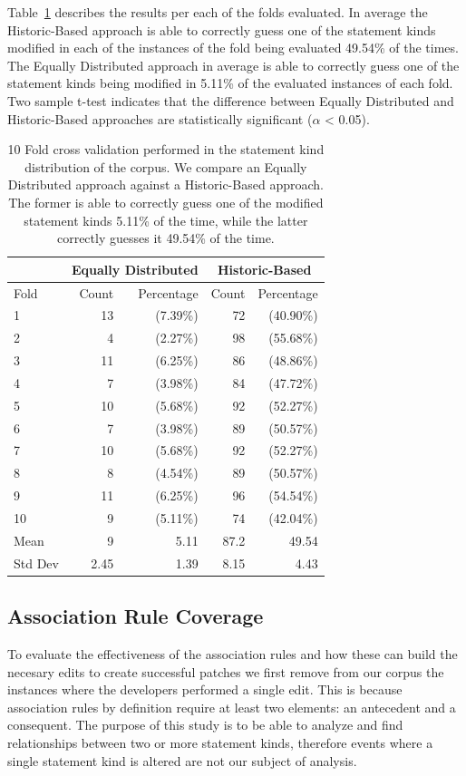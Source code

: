 \documentclass[sigconf]{acmart}
\begin{document}
Table~\ref{10FoldEDvsHB} describes the results per each of the folds evaluated.
In average 
the Historic-Based approach is able to correctly guess one of  the statement kinds modified
in each of the instances of the fold being evaluated 49.54\% of the times. The Equally Distributed approach
in average is able to correctly guess one of the statement kinds being modified in 5.11\% 
of the evaluated instances of each fold.
Two sample t-test indicates that the difference between Equally Distributed and Historic-Based approaches are statistically significant ($\alpha$ < 0.05).


\begin{table}[]
\centering
\caption{10 Fold cross validation performed in the statement kind distribution of the corpus. 
We compare an Equally Distributed approach against a Historic-Based approach. The former is 
able to correctly guess one of the modified statement kinds 5.11\% of the time, while the 
latter correctly guesses it 49.54\% of the time.}
\label{10FoldEDvsHB}
\begin{tabular}{l|rr|rr|}
\toprule
   &   \multicolumn{2}{c|}{ Equally Distributed}   &   \multicolumn{2}{|c|}{ Historic-Based} \\
\midrule
Fold  &   Count & Percentage  &  Count & Percentage  \\
\midrule
1&13&(7.39\%) & 72&(40.90\%) \\
2&4&(2.27\%) & 98&(55.68\%) \\
3&11&(6.25\%) & 86&(48.86\%) \\
4&7&(3.98\%) & 84&(47.72\%) \\
5&10&(5.68\%) & 92&(52.27\%) \\
6&7&(3.98\%) & 89&(50.57\%) \\
7&10&(5.68\%) & 92&(52.27\%) \\
8&8&(4.54\%) & 89&(50.57\%) \\
9&11&(6.25\%) & 96&(54.54\%) \\
10&9&(5.11\%) & 74&(42.04\%) \\
\bottomrule
Mean &9 & 5.11 & 87.2 & 49.54 \\
\bottomrule
Std Dev & 2.45 & 1.39 & 8.15 & 4.43 \\
\bottomrule

\end{tabular}
\end{table}



\subsection{Association Rule Coverage}
To evaluate the effectiveness
of the association rules and how these can build the
necesary edits to create successful patches we first
remove from our corpus the instances where the developers
performed a single edit. This is because association rules
by definition require at least two elements: an antecedent
and a consequent. The purpose of this study is to be able to
analyze and find relationships between two or more statement
kinds, therefore events where a single statement kind is altered
are not our subject of analysis.
\end{document}
